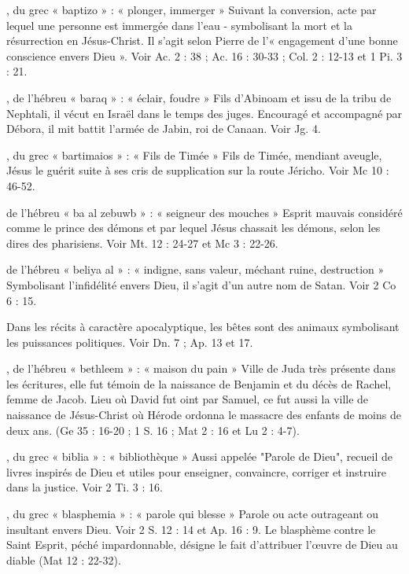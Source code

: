 \begin{multicols}{2}
, du grec « baptizo » : « plonger, immerger »
Suivant la conversion, acte par lequel une personne est immergée dans l'eau - symbolisant la mort et la résurrection en Jésus-Christ. Il s’agit selon Pierre de l’« engagement d'une bonne conscience envers Dieu ». Voir Ac. 2 : 38 ; Ac. 16 : 30-33 ; Col. 2 : 12-13 et 1 Pi. 3 : 21.

, de l'hébreu « baraq » : « éclair, foudre »
Fils d'Abinoam et issu de la tribu de Nephtali, il vécut en Israël dans le temps des juges. Encouragé et accompagné par Débora, il mit battit l'armée de Jabin, roi de Canaan. Voir Jg. 4.

, du grec « bartimaios » : « Fils de Timée »
Fils de Timée, mendiant aveugle, Jésus le guérit suite à ses cris de supplication sur la route Jéricho. Voir Mc 10 : 46-52.

de l'hébreu « ba al zebuwb » : « seigneur des mouches »
Esprit mauvais considéré comme le prince des démons et par lequel Jésus chassait les démons, selon les dires des pharisiens. Voir Mt. 12 : 24-27 et Mc 3 : 22-26.

de l'hébreu « beliya al » : « indigne, sans valeur, méchant ruine, destruction »
Symbolisant l'infidélité envers Dieu, il s’agit d’un autre nom de Satan. Voir 2 Co 6 : 15.

Dans les récits à caractère apocalyptique, les bêtes sont des animaux symbolisant les puissances politiques. Voir Dn. 7 ; Ap. 13 et 17.

, de l’hébreu « bethleem » : « maison du pain »
Ville de Juda très présente dans les écritures, elle fut témoin de la naissance de Benjamin et du décès de Rachel, femme de Jacob. Lieu où David fut oint par Samuel, ce fut aussi la ville de naissance de Jésus-Christ où Hérode ordonna le massacre des enfants de moins de deux ans. (Ge 35 : 16-20 ; 1 S. 16 ; Mat 2 : 16 et Lu 2 : 4-7).

, du grec « biblia » : « bibliothèque »
Aussi appelée "Parole de Dieu", recueil de livres inspirés de Dieu et utiles pour enseigner, convaincre, corriger et instruire dans la justice. Voir 2 Ti. 3 : 16.

, du grec « blasphemia » : « parole qui blesse »
Parole ou acte outrageant ou insultant envers Dieu. Voir 2 S. 12 : 14 et Ap. 16 : 9.
Le blasphème contre le Saint Esprit, péché impardonnable, désigne le fait d'attribuer l'œuvre de Dieu au diable (Mat 12 : 22-32).


\end{multicols}
